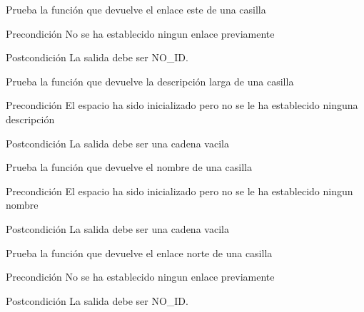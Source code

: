 \begin{DoxyRefList}
\item[\label{test__test000294}%
\hypertarget{test__test000294}{}%
Global \hyperlink{space__test_8c_a48cc005a030d3ed4e8c5476729ab9e4d}{test3\-\_\-space\-\_\-get\-\_\-east} ()]Prueba la función que devuelve el enlace este de una casilla \begin{DoxyPrecond}{Precondición}
No se ha establecido ningun enlace previamente 
\end{DoxyPrecond}
\begin{DoxyPostcond}{Postcondición}
La salida debe ser N\-O\-\_\-\-I\-D.  
\end{DoxyPostcond}

\item[\label{test__test000281}%
\hypertarget{test__test000281}{}%
Global \hyperlink{space__test_8c_a58d0608a4c3b8c8b718e77fcf22f073c}{test3\-\_\-space\-\_\-get\-\_\-long\-\_\-description} ()]Prueba la función que devuelve la descripción larga de una casilla \begin{DoxyPrecond}{Precondición}
El espacio ha sido inicializado pero no se le ha establecido ninguna descripción 
\end{DoxyPrecond}
\begin{DoxyPostcond}{Postcondición}
La salida debe ser una cadena vacila  
\end{DoxyPostcond}

\item[\label{test__test000275}%
\hypertarget{test__test000275}{}%
Global \hyperlink{space__test_8c_ab107ce1ddc16ec8b6c0b5f601d5d71b3}{test3\-\_\-space\-\_\-get\-\_\-name} ()]Prueba la función que devuelve el nombre de una casilla \begin{DoxyPrecond}{Precondición}
El espacio ha sido inicializado pero no se le ha establecido ningun nombre 
\end{DoxyPrecond}
\begin{DoxyPostcond}{Postcondición}
La salida debe ser una cadena vacila  
\end{DoxyPostcond}

\item[\label{test__test000288}%
\hypertarget{test__test000288}{}%
Global \hyperlink{space__test_8c_a02afb1ccfbda36a04009d34d4d05c493}{test3\-\_\-space\-\_\-get\-\_\-north} ()]Prueba la función que devuelve el enlace norte de una casilla \begin{DoxyPrecond}{Precondición}
No se ha establecido ningun enlace previamente 
\end{DoxyPrecond}
\begin{DoxyPostcond}{Postcondición}
La salida debe ser N\-O\-\_\-\-I\-D.  
\end{DoxyPostcond}


\end{DoxyRefList}
